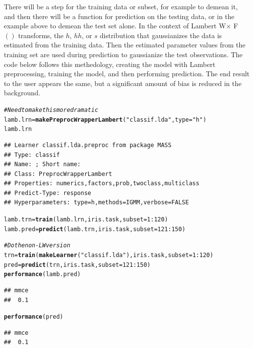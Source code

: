 \documentclass[12pt]{article}\usepackage[]{graphicx}\usepackage[]{color}
\makeatletter
\newcommand{\hlnum}[1]{\textcolor[rgb]{0.686,0.059,0.569}{#1}}%
\newcommand{\hlstr}[1]{\textcolor[rgb]{0.192,0.494,0.8}{#1}}%
\newcommand{\hlcom}[1]{\textcolor[rgb]{0.678,0.584,0.686}{\textit{#1}}}%
\newcommand{\hlopt}[1]{\textcolor[rgb]{0,0,0}{#1}}%
\newcommand{\hlstd}[1]{\textcolor[rgb]{0.345,0.345,0.345}{#1}}%
\newcommand{\hlkwb}[1]{\textcolor[rgb]{0.69,0.353,0.396}{#1}}%
\newcommand{\hlkwc}[1]{\textcolor[rgb]{0.333,0.667,0.333}{#1}}%
\newcommand{\hlkwd}[1]{\textcolor[rgb]{0.737,0.353,0.396}{\textbf{#1}}}%
\newenvironment{kframe}{%
 \def\at@end@of@kframe{}%
 \ifinner\ifhmode%
  \def\at@end@of@kframe{\end{minipage}}%
  \begin{minipage}{\columnwidth}%
 \fi\fi%
 \def\FrameCommand##1{\hskip\@totalleftmargin \hskip-\fboxsep
 \colorbox{shadecolor}{##1}\hskip-\fboxsep
     \hskip-\linewidth \hskip-\@totalleftmargin \hskip\columnwidth}%
 \MakeFramed {\advance\hsize-\width
   \@totalleftmargin\z@ \linewidth\hsize
   \@setminipage}}%
 {\par\unskip\endMakeFramed%
 \at@end@of@kframe}
\newenvironment{knitrout}{}{} %
\theoremstyle{definition}
\makeatother
\begin{document}
There will be a step for the training data or subset, for example to demean it, and then there will be a function for prediction on the testing data, or in the example above to demean the test set alone. In the context of Lambert W$\times$ F$()$ transforms, the $h$, $hh$, or $s$ distribution that gaussianizes the data is estimated from the training data. Then the estimated parameter values from the training set are used during prediction to gaussianize the test observations. The code below follows this methedology, creating the model with Lambert preprocessing, training the model, and then performing prediction. The end result to the user appears the same, but a significant amount of bias is reduced in the background.

\singlespacing
\begin{knitrout}
\color{fgcolor}\begin{kframe}
\begin{alltt}
\hlcom{# Need to make this more dramatic}
\hlstd{lamb.lrn} \hlkwb{=} \hlkwd{makePreprocWrapperLambert}\hlstd{(}\hlstr{"classif.lda"}\hlstd{,} \hlkwc{type} \hlstd{=} \hlstr{"h"}\hlstd{)}
\hlstd{lamb.lrn}
\end{alltt}
\begin{verbatim}
## Learner classif.lda.preproc from package MASS
## Type: classif
## Name: ; Short name: 
## Class: PreprocWrapperLambert
## Properties: numerics,factors,prob,twoclass,multiclass
## Predict-Type: response
## Hyperparameters: type=h,methods=IGMM,verbose=FALSE
\end{verbatim}
\begin{alltt}
\hlstd{lamb.trn} \hlkwb{=} \hlkwd{train}\hlstd{(lamb.lrn,iris.task,} \hlkwc{subset} \hlstd{=} \hlnum{1}\hlopt{:}\hlnum{120}\hlstd{)}
\hlstd{lamb.pred} \hlkwb{=} \hlkwd{predict}\hlstd{(lamb.trn, iris.task,} \hlkwc{subset} \hlstd{=} \hlnum{121}\hlopt{:}\hlnum{150}\hlstd{)}

\hlcom{# Do the non-LW version}
\hlstd{trn} \hlkwb{=} \hlkwd{train}\hlstd{(}\hlkwd{makeLearner}\hlstd{(}\hlstr{"classif.lda"}\hlstd{),iris.task,} \hlkwc{subset} \hlstd{=} \hlnum{1}\hlopt{:}\hlnum{120}\hlstd{)}
\hlstd{pred} \hlkwb{=} \hlkwd{predict}\hlstd{(trn, iris.task,} \hlkwc{subset} \hlstd{=} \hlnum{121}\hlopt{:}\hlnum{150}\hlstd{)}
\hlkwd{performance}\hlstd{(lamb.pred)}
\end{alltt}
\begin{verbatim}
## mmce 
##  0.1
\end{verbatim}
\begin{alltt}
\hlkwd{performance}\hlstd{(pred)}
\end{alltt}
\begin{verbatim}
## mmce 
##  0.1
\end{verbatim}
\end{kframe}
\end{knitrout}
\doublespacing
\end{document}
